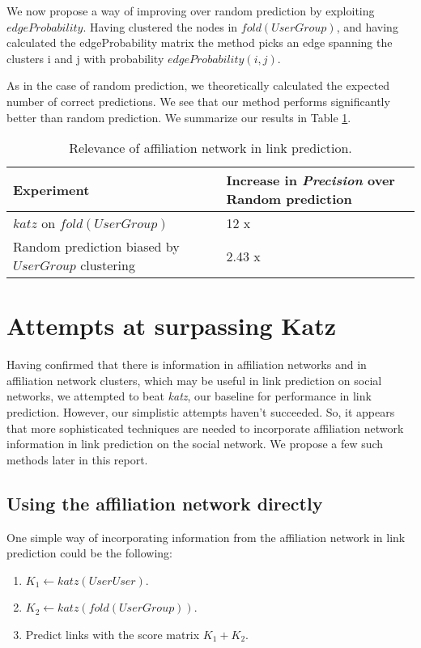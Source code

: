 \documentclass{report}
\begin{document}
We now propose a way of improving over random prediction by exploiting $edgeProbability$. Having clustered the nodes in $fold(UserGroup)$, and having calculated the edgeProbability matrix the method picks an edge spanning the clusters i and j with probability $edgeProbability(i, j)$.

As in the case of random prediction, we theoretically calculated the expected number of correct predictions. We see that our method performs significantly better than random prediction. We summarize our results in Table \ref{tab:confirmation}.

\begin{table}
\centering
\begin{tabular}{| p{5cm} |  p{5cm} |}
\hline
Experiment& Increase in \textit{Precision} over Random prediction\\
\hline
$katz$ on $fold(UserGroup)$&12 x\\
\hline
Random prediction biased by $UserGroup$ clustering &2.43 x\\
\hline
\end{tabular}
\caption{Relevance of affiliation network in link prediction.}
\label{tab:confirmation}
\end{table} 

\section{Attempts at surpassing Katz}
Having confirmed that there is information in affiliation networks and in affiliation network clusters, which may be useful in link prediction on social networks, we attempted to beat \textit{katz}, our baseline for performance in link prediction. However, our simplistic attempts haven't succeeded. So, it appears that more sophisticated techniques are needed to incorporate affiliation network information in link prediction on the social network. We propose a few such methods later in this report.

\subsection{Using the affiliation network directly}
One simple way of incorporating information from the affiliation network in link prediction could be the following: 
\begin{enumerate}
 \item $K_1 \gets katz(UserUser)$.
 \item $K_2 \gets katz(fold(UserGroup))$.
 \item Predict links with the score matrix $K_1 + K_2$.
\end{enumerate}
\end{document}

